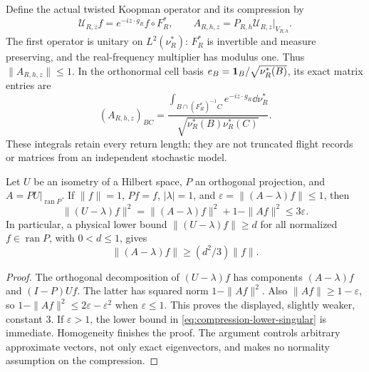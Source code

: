 Define the actual twisted Koopman operator and its compression by
\begin{equation}\label{eq:actual-compressed-operator}
 \mathcal U_{R,z}f=e^{-iz\cdot g_R}f\circ F_R^*,\qquad
 A_{R,h,z}=P_{R,h}\mathcal U_{R,z}|_{V_{R,h}}.
\end{equation}
The first operator is unitary on $L^2(\nu_R^*)$: $F_R^*$ is invertible
and measure preserving, and the real-frequency multiplier has modulus
one. Thus $\|A_{R,h,z}\|\le1$. In the orthonormal cell basis
$e_B=\mathbf1_B/\sqrt{\nu_R^*(B)}$, its exact matrix entries are
\begin{equation}\label{eq:actual-compressed-matrix}
 (A_{R,h,z})_{BC}=
 \frac{\displaystyle\int_{B\cap(F_R^*)^{-1}C}
                         e^{-iz\cdot g_R}\dd\nu_R^*}
      {\sqrt{\nu_R^*(B)\nu_R^*(C)}}.
\end{equation}
These integrals retain every return length; they are not truncated
flight records or matrices from an independent stochastic model.

\begin{lemma}
\label{lem:compression-defect-comparison}
Let $U$ be an isometry of a Hilbert space, $P$ an orthogonal projection,
and $A=PU|_{\operatorname{ran}P}$. If $\|f\|=1$, $Pf=f$,
$|\lambda|=1$, and $\varepsilon=\|(A-\lambda)f\|\le1$, then
\begin{equation}\label{eq:compression-defect-comparison}
 \|(U-\lambda)f\|^2
   =\|(A-\lambda)f\|^2+1-\|Af\|^2
   \le3\varepsilon.
\end{equation}
In particular, a physical lower bound
$\|(U-\lambda)f\|\ge d$ for all normalized $f\in\operatorname{ran}P$,
with $0<d\le1$, gives
\begin{equation}\label{eq:compression-lower-singular}
 \|(A-\lambda)f\|\ge(d^2/3)\|f\|.
\end{equation}
\end{lemma}
\begin{proof}
The orthogonal decomposition of $(U-\lambda)f$ has components
$(A-\lambda)f$ and $(I-P)Uf$. The latter has squared norm
$1-\|Af\|^2$. Also $\|Af\|\ge1-\varepsilon$, so
$1-\|Af\|^2\le2\varepsilon-\varepsilon^2$ when
$\varepsilon\le1$. This proves the displayed, slightly weaker,
constant $3$. If $\varepsilon>1$, the lower bound in
\eqref{eq:compression-lower-singular} is immediate. Homogeneity
finishes the proof. The argument controls arbitrary approximate
vectors, not only exact eigenvectors, and makes no normality assumption
on the compression.
\end{proof}


